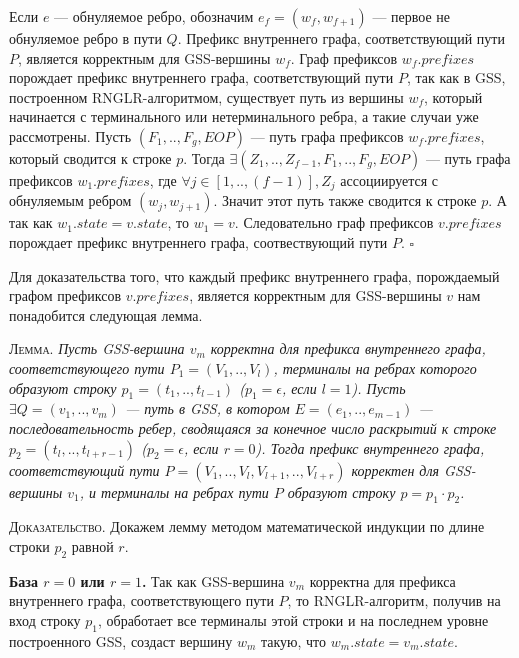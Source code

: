 Если $e$ --- обнуляемое ребро, обозначим $e_{f} = (w_{f}, w_{f+1})$ --- первое не обнуляемое ребро в пути $Q$. Префикс внутреннего графа, соответствующий пути $P$, является корректным для GSS-вершины $w_{f}$. Граф префиксов $w_{f}.prefixes$ порождает префикс внутреннего графа, соответствующий пути $P$, так как в GSS, построенном RNGLR-алгоритмом, существует путь из вершины $w_{f}$, который начинается с терминального или нетерминального ребра, а такие случаи уже рассмотрены. Пусть $(F_{1},..,F_{g},EOP)$ --- путь графа префиксов $w_{f}.prefixes$, который сводится к строке $p$. Тогда $\exists (Z_{1},..,Z_{f-1},F_{1},..,F_{g},EOP)$ --- путь графа префиксов $w_{1}.prefixes$, где $\forall j \in [1,..,(f-1)], Z_{j}$ ассоциируется с обнуляемым ребром $(w_{j}, w_{j+1})$. Значит этот путь также сводится к строке $p$. А так как $w_{1}.state = v.state$, то $w_{1} = v$. Следовательно граф префиксов $v.prefixes$ порождает префикс внутреннего графа, соотвествующий пути $P$. $\square$


Для доказательства того, что каждый префикс внутреннего графа, порождаемый графом префиксов $v.prefixes$, является корректным для GSS-вершины $v$ нам понадобится следующая лемма.


\textsc{Лемма.}
\textit{Пусть GSS-вершина $v_{m}$ корректна для префикса внутреннего графа, соответствующего пути $P_{1} = (V_{1},..,V_{l})$, терминалы на ребрах которого образуют строку $p_{1} = (t_{1},..,t_{l-1})$ ($p_{1} = \epsilon$, если $l = 1$). Пусть $\exists Q = (v_{1},..,v_{m})$ --- путь в GSS, в котором $E = (e_{1},..,e_{m-1})$ --- последовательность ребер, сводящаяся за конечное число раскрытий к строке $p_{2} = (t_{l},..,t_{l+r-1})$ ($p_{2} = \epsilon$, если $r = 0$). Тогда префикс внутреннего графа, соответствующий пути $P = (V_{1},..,V_{l}, V_{l+1},..,V_{l+r})$ корректен для GSS-вершины $v_{1}$, и терминалы на ребрах пути $P$ образуют строку $p = p_{1} \cdot p_{2}$.}
% 

\textsc{Доказательство.}
Докажем лемму методом математической индукции по длине строки $p_{2}$ равной $r$.

\textbf{База $r = 0$ или $r = 1$.} Так как GSS-вершина $v_{m}$ корректна для префикса внутреннего графа, соответствующего пути $P$, то RNGLR-алгоритм, получив на вход строку  $p_{1}$, обработает все терминалы этой строки и на последнем уровне построенного GSS, создаст вершину $w_{m}$ такую, что $w_{m}.state = v_{m}.state$.

